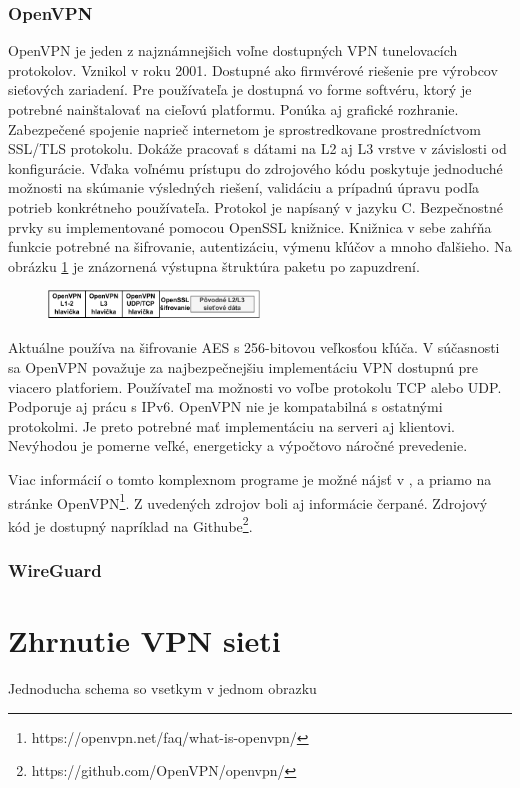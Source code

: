 \subsubsection{OpenVPN}
OpenVPN je jeden z najznámnejšich voľne dostupných VPN tunelovacích protokolov. Vznikol v roku 2001. Dostupné ako firmvérové riešenie pre výrobcov sieťových zariadení. Pre používateľa je dostupná vo forme softvéru, ktorý je potrebné nainštalovať na cieľovú platformu. Ponúka aj grafické rozhranie. Zabezpečené spojenie naprieč internetom je sprostredkovane prostredníctvom SSL/TLS protokolu. Dokáže pracovať s dátami na L2 aj L3 vrstve v závislosti od konfigurácie. Vďaka voľnému prístupu do zdrojového kódu poskytuje jednoduché možnosti na skúmanie výsledných riešení, validáciu a prípadnú úpravu podľa potrieb konkrétneho používateľa. Protokol je napísaný v jazyku C. Bezpečnostné prvky su implementované pomocou OpenSSL knižnice. Knižnica v sebe zahŕňa funkcie potrebné na šifrovanie, autentizáciu, výmenu kľúčov a mnoho ďalšieho. Na obrázku \ref{ovpnptstrc} je znázornená výstupna štruktúra paketu po zapuzdrení. 
\begin{figure}[!h]
	\centering
	\includegraphics[width=0.5\textwidth]{figures/ovpnptstrc}
	\caption{}
	\label{ovpnptstrc}
\end{figure}

Aktuálne používa na šifrovanie AES s 256-bitovou veľkosťou kľúča. V súčasnosti sa OpenVPN považuje za najbezpečnejšiu implementáciu VPN dostupnú pre viacero platforiem. Používateľ ma možnosti vo voľbe protokolu TCP alebo UDP. Podporuje aj prácu s IPv6. OpenVPN nie je kompatabilná s ostatnými protokolmi. Je preto potrebné mať implementáciu na serveri aj klientovi. Nevýhodou je pomerne veľké, energeticky a výpočtovo náročné prevedenie.

Viac informácií o tomto komplexnom programe je možné nájsť v \cite{vpntech}, \cite{ovpn} a priamo na stránke OpenVPN\footnote{https://openvpn.net/faq/what-is-openvpn/}. Z uvedených zdrojov boli aj informácie čerpané. Zdrojový kód je dostupný napríklad na Githube\footnote{https://github.com/OpenVPN/openvpn/}. 
\subsubsection{WireGuard}

\section{Zhrnutie VPN sieti}
Jednoducha schema so vsetkym v jednom obrazku \\

